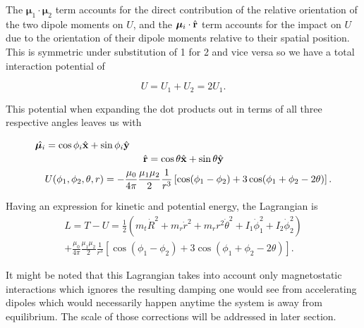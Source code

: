 \documentclass[prbg,preprint]{revtex4-1}
\newcommand{\cvec}[1]{{\rm{\bf{#1}}}}
\begin{document}
The $\boldsymbol \mu_1 \cdot \boldsymbol \mu_2$ term accounts 
for the direct contribution of the relative orientation of the two dipole moments on $U$, 
and the $\boldsymbol \mu_i \cdot \hat {\cvec r}$ term accounts for the impact on $U$ due to the orientation of their dipole moments relative to their spatial position.
This is symmetric under substitution of 1 for 2 and vice versa so we have a total interaction potential of

\begin{equation}
U =
U_1+U_2
= 
2U_1.
\end{equation}

This potential when expanding the dot products out in terms of all three respective angles leaves us with

\begin{equation}
  \begin{multlined}
\hat {\boldsymbol \mu_i} =  \cos \phi_i \hat {\cvec x} + \sin \phi_i \hat {\cvec y}
\\
\hat {\cvec r} =  \cos \theta \hat {\cvec x} + \sin \theta \hat {\cvec y}
\\
U(\phi_1, \phi_2, \theta, r) =
-\frac{\mu_0}{4\pi}
\frac{\mu_1 \mu_2}{2}
\frac{1}{r^3}\left[
	\cos(\phi_1-\phi_2)
	+3\cos(\phi_1+\phi_2 -2\theta)
\right].
  \end{multlined}
\end{equation}

Having an expression for kinetic and potential energy, the Lagrangian is 
\begin{equation}
  \begin{multlined}
    L=T-U=
    \frac{1}{2}(
        m_t \dot R^2
        +m_r \dot r^2
        +m_r r^2 \dot \theta^2
        + I_1 \dot \phi_1^2
        + I_2 \dot \phi_2^2
    )
    \\
    +
    \frac{\mu_0}{4\pi}
    \frac{\mu_1 \mu_2}{2}
    \frac{1}{r^3}
    [
        \cos(\phi_1-\phi_2)
        +3\cos(\phi_1+\phi_2 -2\theta)
    ].
  \end{multlined}
\end{equation}

It might be noted that this Lagrangian takes into account only magnetostatic interactions which ignores the resulting damping one would see from accelerating dipoles which would necessarily happen anytime the system is away from equilibrium. The scale of those corrections will be addressed in  later section.
\end{document}
